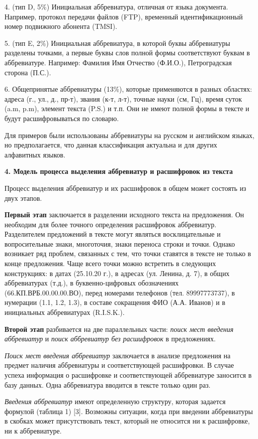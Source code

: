 \documentclass[a4paper]{article}
\begin{document}
4. (тип D, 5\%) Инициальная аббревиатура, отличная от языка документа. Например, протокол передачи файлов (FTP), временный идентификационный номер подвижного абонента (TMSI).

5. (тип E, 2\%) Инициальная аббревиатура, в которой буквы аббревиатуры разделены точками, а первые буквы слов полной формы соответствуют буквам в аббревиатуре. Например: Фамилия Имя Отчество (Ф.И.О.), Петроградская сторона (П.С.).

6. Общепринятые аббревиатуры (13\%), которые применяются в разных областях: адреса (г., ул., д., пр-т), звания (к-т, л-т), точные науки (см, Гц), время суток (a.m, p.m), элемент текста (P.S.) и т.п. Они не имеют полной формы в тексте и будут расшифровываться по словарю.

Для примеров были использованы аббревиатуры на русском и английском языках, но предполагается, что данная классификация актуальна и для других алфавитных языков.

\textbf{4. Модель процесса выделения аббревиатур и расшифровок из текста}

Процесс выделения аббревиатур и их расшифровок в общем может состоять из двух этапов.

\textbf{Первый этап} заключается в разделении исходного текста на предложения. Он необходим для более точного определения расшифровок аббревиатур. Разделителем предложений в тексте могут являться восклицательные и вопросительные знаки, многоточия, знаки переноса строки и точки. Однако возникает ряд проблем, связанных с тем, что точки ставятся в тексте не только в конце предложения. Чаще всего точки можно встретить в следующих конструкциях: в датах (25.10.20 г.), в адресах (ул. Ленина, д. 7), в общих аббревиатурах (т.д.), в буквенно-цифровых обозначениях (66.КП.ВРБ.00.00.00.ВО), перед номерами телефонов (тел. 89997773737), в нумерации (1.1, 1.2, 1.3), в составе сокращения ФИО (А.А. Иванов) и в инициальных аббревиатурах (R.I.S.K.).

\textbf{Второй этап} разбивается на две параллельных части: \textit{поиск мест
введения аббревиатур} и \textit{поиск аббревиатур без расшифровок} в предложениях.

\textit{Поиск мест введения аббревиатур} заключается в анализе предложения на предмет наличия аббревиатуры и соответствующей расшифровки. В случае успеха информация о расшифровке и соответствующей аббревиатуре заносится в базу данных. Одна аббревиатура вводится в тексте только один раз.

\textit{Введения аббревиатур} имеют определенную структуру, которая задается формулой (таблица 1) [3]. Возможны ситуации, когда при введении аббревиатуры в скобках может присутствовать текст, который не относится ни к расшифровке, ни к аббревиатуре.
\end{document}
